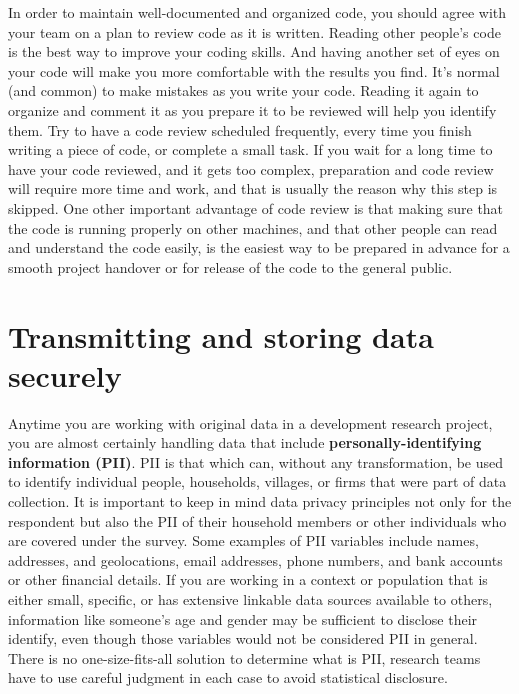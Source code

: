 In order to maintain well-documented and organized code,
you should agree with your team on a plan to review code as it is written.
Reading other people's code is the best way to improve your coding skills.
And having another set of eyes on your code will make you more comfortable with the results you find.
It's normal (and common) to make mistakes as you write your code.
Reading it again to organize and comment it as you prepare it to be reviewed will help you identify them.
Try to have a code review scheduled frequently,
every time you finish writing a piece of code, or complete a small task.
If you wait for a long time to have your code reviewed, and it gets too complex,
preparation and code review will require more time and work,
and that is usually the reason why this step is skipped.
One other important advantage of code review is that
making sure that the code is running properly on other machines,
and that other people can read and understand the code easily,
is the easiest way to be prepared in advance for a smooth project handover
or for release of the code to the general public.


\section{Transmitting and storing data securely}
Anytime you are working with original data in a development research project,
you are almost certainly handling data that include 
\textbf{personally-identifying	information (PII)}.
PII is that which can, without any transformation, be used to identify
individual people, households, villages, or firms that were part of data collection.
It is important to keep in mind data privacy principles not only for the respondent 
but also the PII of their household members or other individuals who are covered under the survey.
Some examples of PII variables include names, addresses, and geolocations, email addresses, phone numbers, 
and bank accounts or other financial details.
If you are working in a context or population that is either small, specific,
or has extensive linkable data sources available to others,
information like someone's age and gender may be sufficient to 
disclose their identify, even though those variables would not be considered PII in general.
There is no one-size-fits-all solution to determine what is PII, 
research teams have to use careful judgment in each case to avoid statistical disclosure.

